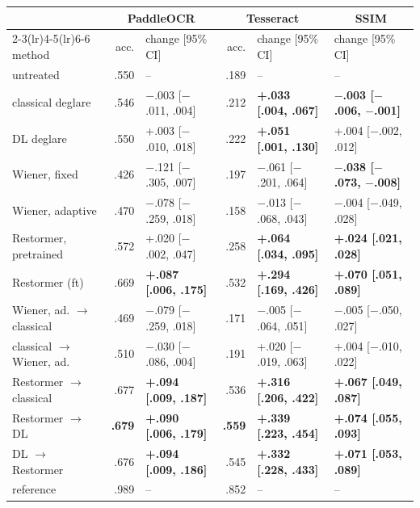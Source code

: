 \begin{tabular}{lrlrll}
\toprule
 & \multicolumn{2}{c}{PaddleOCR} & \multicolumn{2}{c}{Tesseract} & \multicolumn{1}{c}{SSIM} \\
\cmidrule(lr){2-3}\cmidrule(lr){4-5}\cmidrule(lr){6-6}
method & acc. & change [95\% CI] & acc. & change [95\% CI] & change [95\% CI] \\
\midrule
untreated & .550 & -- & .189 & -- & -- \\
classical deglare & .546 & $-$.003 [$-$.011, .004] & .212 & \textbf{+.033 [.004, .067]} & \textbf{$-$.003 [$-$.006, $-$.001]} \\
DL deglare & .550 & +.003 [$-$.010, .018] & .222 & \textbf{+.051 [.001, .130]} & +.004 [$-$.002, .012] \\
Wiener, fixed & .426 & $-$.121 [$-$.305, .007] & .197 & $-$.061 [$-$.201, .064] & \textbf{$-$.038 [$-$.073, $-$.008]} \\
Wiener, adaptive & .470 & $-$.078 [$-$.259, .018] & .158 & $-$.013 [$-$.068, .043] & $-$.004 [$-$.049, .028] \\
Restormer, pretrained & .572 & +.020 [$-$.002, .047] & .258 & \textbf{+.064 [.034, .095]} & \textbf{+.024 [.021, .028]} \\
Restormer (ft) & .669 & \textbf{+.087 [.006, .175]} & .532 & \textbf{+.294 [.169, .426]} & \textbf{+.070 [.051, .089]} \\
Wiener, ad. $\rightarrow$ classical & .469 & $-$.079 [$-$.259, .018] & .171 & $-$.005 [$-$.064, .051] & $-$.005 [$-$.050, .027] \\
classical $\rightarrow$ Wiener, ad. & .510 & $-$.030 [$-$.086, .004] & .191 & +.020 [$-$.019, .063] & +.004 [$-$.010, .022] \\
Restormer $\rightarrow$ classical & .677 & \textbf{+.094 [.009, .187]} & .536 & \textbf{+.316 [.206, .422]} & \textbf{+.067 [.049, .087]} \\
Restormer $\rightarrow$ DL & \textbf{.679} & \textbf{+.090 [.006, .179]} & \textbf{.559} & \textbf{+.339 [.223, .454]} & \textbf{+.074 [.055, .093]} \\
DL $\rightarrow$ Restormer & .676 & \textbf{+.094 [.009, .186]} & .545 & \textbf{+.332 [.228, .433]} & \textbf{+.071 [.053, .089]} \\
\midrule
reference & .989 & -- & .852 & -- & -- \\
\bottomrule
\end{tabular}
